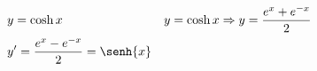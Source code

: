\begin{ex}
\begin{align}
&y=\cosh{x}
&y=\cosh{x} \Rightarrow y=\frac{e^{x}+e^{-x}}{2}\nonumber\\
&y'=\frac{e^{x}-e^{-x}}{2} = \senh{x}\nonumber
\end{align}
\end{ex}
